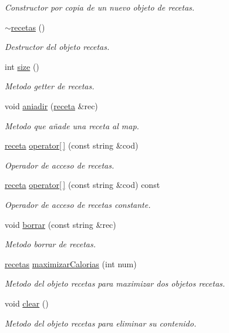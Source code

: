 \begin{DoxyCompactItemize}
\begin{DoxyCompactList}\small\item\em Constructor por copia de un nuevo objeto de recetas. \end{DoxyCompactList}\item 
\hyperlink{classrecetas_a2f1ebaeabb8cc344cb7af3667f99645c}{$\sim$recetas} ()
\begin{DoxyCompactList}\small\item\em Destructor del objeto recetas. \end{DoxyCompactList}\item 
int \hyperlink{classrecetas_a9d208c157f2dc674b48e11d359de911a}{size} ()
\begin{DoxyCompactList}\small\item\em Metodo getter de recetas. \end{DoxyCompactList}\item 
void \hyperlink{classrecetas_af55a0d5e9394710cf6390fa67f38b49a}{aniadir} (\hyperlink{classreceta}{receta} \&rec)
\begin{DoxyCompactList}\small\item\em Metodo que añade una receta al map. \end{DoxyCompactList}\item 
\hyperlink{classreceta}{receta} \hyperlink{classrecetas_a4faf113ab37ebccbb2e72def72417aad}{operator\mbox{[}$\,$\mbox{]}} (const string \&cod)
\begin{DoxyCompactList}\small\item\em Operador de acceso de recetas. \end{DoxyCompactList}\item 
\hyperlink{classreceta}{receta} \hyperlink{classrecetas_a746208f984694cc8d24c09fd01ad234b}{operator\mbox{[}$\,$\mbox{]}} (const string \&cod) const
\begin{DoxyCompactList}\small\item\em Operador de acceso de recetas constante. \end{DoxyCompactList}\item 
void \hyperlink{classrecetas_a52f721a2505cd731718bec3c2231cce7}{borrar} (const string \&rec)
\begin{DoxyCompactList}\small\item\em Metodo borrar de recetas. \end{DoxyCompactList}\item 
\hyperlink{classrecetas}{recetas} \hyperlink{classrecetas_a98a30fdaea9da3554bff98e9590e80e8}{maximizar\+Calorias} (int num)
\begin{DoxyCompactList}\small\item\em Metodo del objeto recetas para maximizar dos objetos recetas. \end{DoxyCompactList}\item 
void \hyperlink{classrecetas_a25f33192eb91a795e29261456d822dad}{clear} ()
\begin{DoxyCompactList}\small\item\em Metodo del objeto recetas para eliminar su contenido. \end{DoxyCompactList}\end{DoxyCompactItemize}
